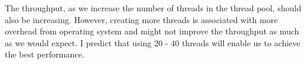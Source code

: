 \documentclass[11pt]{article}
\begin{document}
The throughput, as we increase the number of threads in the thread pool, should also be increasing. However, creating more threads is associated with more overhead from operating system and might not improve the throughput as much as we would expect. I predict that using 20 - 40 threads will enable us to achieve the best performance.

\end{document}
